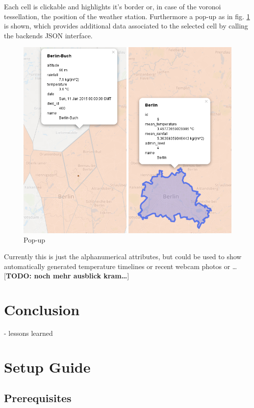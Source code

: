 \documentclass[paper=a4, fontsize=11pt]{scrartcl} %
\numberwithin{equation}{section} %
\numberwithin{figure}{section} %
\numberwithin{table}{section} %
\begin{document}
\newpage
Each cell is clickable and highlights it's border or, in case of the
voronoi tessellation, the position of the weather station. Furthermore a
pop-up as in fig. \ref{fig:popup} is shown, which provides additional data associated to the
selected cell by calling the backends JSON interface.

\begin{figure}[htbp]
\centering
\includegraphics[width=1\textwidth]{pictures/screenshot-popup.png}
\caption{Pop-up}
\label{fig:popup}
\end{figure}

Currently this is just the alphanumerical attributes, but could be used
to show automatically generated temperature timelines or recent webcam
photos or \ldots{} {[}\textbf{TODO: noch mehr ausblick kram\ldots{}}{]}

\section{Conclusion}
	- lessons learned

\section{Setup Guide}
\subsection{Prerequisites}
\end{document}
